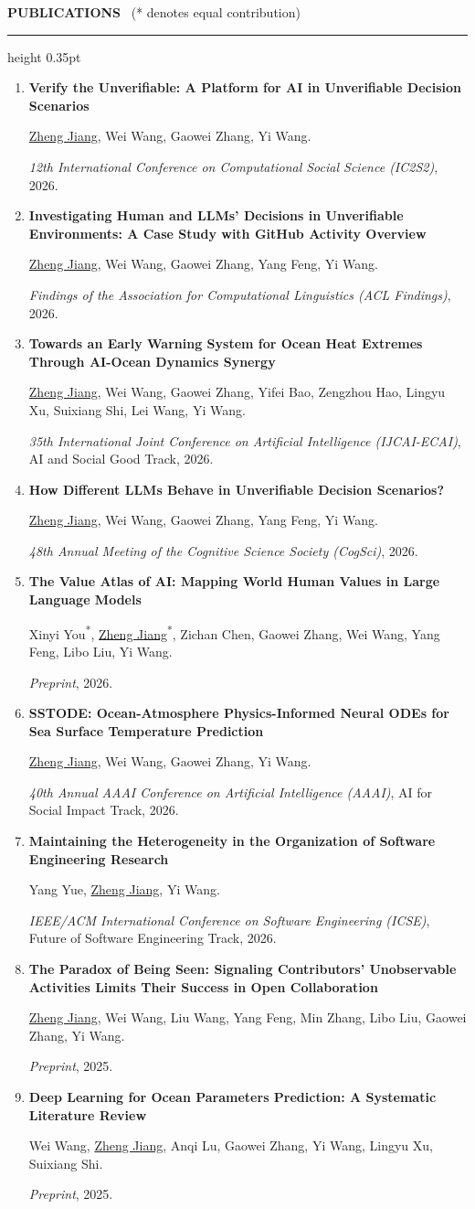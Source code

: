 \documentclass[10pt,letterpaper]{article}
\newcommand{\self}{\uline{Zheng Jiang}}
\newcommand{\cvsection}[2]{%
  \Needspace{5\baselineskip}%
  \vspace{5.5pt}%
  {\color{sectionblue}\bfseries\fontsize{10.8}{12}\selectfont #1}%
  {\normalfont\color{black}\fontsize{9.4}{10.5}\selectfont\ #2}%
  \par\vspace{1.1pt}%
  {\color{rulegray}\hrule height 0.35pt}%
  \vspace{3.5pt}%
}
\newcommand{\pubitem}[3]{%
  \needspace{4.8\baselineskip}%
  \item \textbf{#1}\par\vspace{-0.4pt}%
  #2\par\vspace{-0.4pt}%
  #3%
}
\begin{document}
\cvsection{PUBLICATIONS}{(* denotes equal contribution)}
\begin{enumerate}
  \pubitem{Verify the Unverifiable: A Platform for AI in Unverifiable Decision Scenarios}
    {\self, Wei Wang, Gaowei Zhang, Yi Wang.}
    {\textit{12th International Conference on Computational Social Science (IC2S2)}, 2026.}

  \pubitem{Investigating Human and LLMs' Decisions in Unverifiable Environments: A Case Study with GitHub Activity Overview}
    {\self, Wei Wang, Gaowei Zhang, Yang Feng, Yi Wang.}
    {\textit{Findings of the Association for Computational Linguistics (ACL Findings)}, 2026.}

  \pubitem{Towards an Early Warning System for Ocean Heat Extremes Through AI-Ocean Dynamics Synergy}
    {\self, Wei Wang, Gaowei Zhang, Yifei Bao, Zengzhou Hao, Lingyu Xu, Suixiang Shi, Lei Wang, Yi Wang.}
    {\textit{35th International Joint Conference on Artificial Intelligence (IJCAI-ECAI)}, AI and Social Good Track, 2026.}

  \pubitem{How Different LLMs Behave in Unverifiable Decision Scenarios?}
    {\self, Wei Wang, Gaowei Zhang, Yang Feng, Yi Wang.}
    {\textit{48th Annual Meeting of the Cognitive Science Society (CogSci)}, 2026.}

  \pubitem{The Value Atlas of AI: Mapping World Human Values in Large Language Models}
    {Xinyi You\textsuperscript{*}, \self\textsuperscript{*}, Zichan Chen, Gaowei Zhang, Wei Wang, Yang Feng, Libo Liu, Yi Wang.}
    {\textit{Preprint}, 2026.}

  \pubitem{SSTODE: Ocean-Atmosphere Physics-Informed Neural ODEs for Sea Surface Temperature Prediction}
    {\self, Wei Wang, Gaowei Zhang, Yi Wang.}
    {\textit{40th Annual AAAI Conference on Artificial Intelligence (AAAI)}, AI for Social Impact Track, 2026.}

  \pubitem{Maintaining the Heterogeneity in the Organization of Software Engineering Research}
    {Yang Yue, \self, Yi Wang.}
    {\textit{IEEE/ACM International Conference on Software Engineering (ICSE)}, Future of Software Engineering Track, 2026.}

  \pubitem{The Paradox of Being Seen: Signaling Contributors' Unobservable Activities Limits Their Success in Open Collaboration}
    {\self, Wei Wang, Liu Wang, Yang Feng, Min Zhang, Libo Liu, Gaowei Zhang, Yi Wang.}
    {\textit{Preprint}, 2025.}

  \pubitem{Deep Learning for Ocean Parameters Prediction: A Systematic Literature Review}
    {Wei Wang, \self, Anqi Lu, Gaowei Zhang, Yi Wang, Lingyu Xu, Suixiang Shi.}
    {\textit{Preprint}, 2025.}


\end{enumerate}
\end{document}
